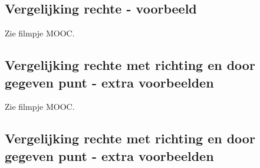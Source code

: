 
\subsection{Vergelijking rechte - voorbeeld}
Zie filmpje MOOC.

\subsection{Vergelijking rechte met richting en door gegeven punt - extra voorbeelden}
Zie filmpje MOOC.

\subsection{Vergelijking rechte met richting en door gegeven punt - extra voorbeelden}

